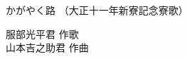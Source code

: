 \documentclass[10pt,b5j]{tarticle} %
\begin{document}
\begin{minipage}[c]{0.7\hsize} %
    \begin{center}
        {\LARGE
            かがやく路 %
        }
        {\small 
            （大正十一年新寮記念寮歌） %
        }
    \end{center}
\end{minipage}
\begin{minipage}[c]{0.3\hsize} %
    \begin{flushright} %
        服部光平君 作歌\\山本吉之助君 作曲 %
    \end{flushright}
\end{minipage}
\end{document}
